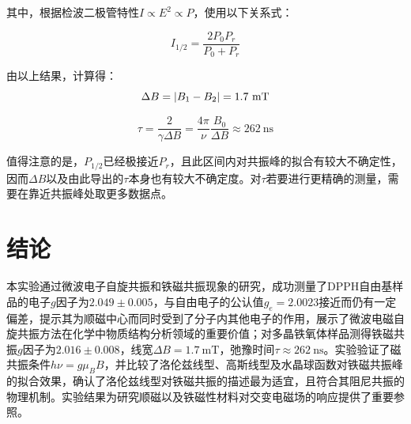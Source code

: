 \documentclass{thuemp}
\begin{document}
    其中，根据检波二极管特性$I \propto E^2 \propto P$，使用以下关系式：
    
    \begin{equation}
        I_{1/2} = \frac{2P_0P_r}{P_0+P_r}
    \end{equation}
    
    由以上结果，计算得：
    \begin{equation}
        \Delta B = |B_1 - B_2| = 1.7 ~\text{\si{\milli\tesla}}
    \end{equation}
    
    \begin{equation}
        \tau = \frac{2}{\gamma\Delta B}
             = \frac{4\pi}{\nu}\frac{B_0}{\Delta B}
             \approx 262 ~ \text{ns}
    \end{equation}
    
    值得注意的是，$P_{1/2}$已经极接近$P_r$，且此区间内对共振峰的拟合有较大不确定性，因而$\Delta B$以及由此导出的$\tau$本身也有较大不确定度。对$\tau$若要进行更精确的测量，需要在靠近共振峰处取更多数据点。
    
    \section{结论}
    
    本实验通过微波电子自旋共振和铁磁共振现象的研究，成功测量了DPPH自由基样品的电子$g$因子为$2.049 \pm 0.005$，与自由电子的公认值$g_e=2.0023$接近而仍有一定偏差，提示其为顺磁中心而同时受到了分子内其他电子的作用，展示了微波电磁自旋共振方法在化学中物质结构分析领域的重要价值；对多晶铁氧体样品测得铁磁共振$g$因子为$2.016 \pm 0.008$，线宽$\Delta B = \SI{1.7}{\milli\tesla}$，弛豫时间$\tau \approx \SI{262}{\nano\second}$。实验验证了磁共振条件$h\nu = g\mu_B B$，并比较了洛伦兹线型、高斯线型及水晶球函数对铁磁共振峰的拟合效果，确认了洛伦兹线型对铁磁共振的描述最为适宜，且符合其阻尼共振的物理机制。实验结果为研究顺磁以及铁磁性材料对交变电磁场的响应提供了重要参照。
    
    
    
    \renewcommand\refname{\heiti\wuhao\centerline{参考文献}\global\def\refname{参考文献}}
    \vskip 12pt
    
    \let\OLDthebibliography\thebibliography
    \renewcommand\thebibliography[1]{
      \OLDthebibliography{#1}
      \setlength{\parskip}{0pt}
      \setlength{\itemsep}{0pt plus 0.3ex}
    }
    
\end{document}
